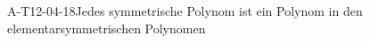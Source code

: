 
\begin{PROP}{A-T12-04-18}{Jedes symmetrische Polynom ist ein Polynom in den elementarsymmetrischen Polynomen}
\end{PROP}
